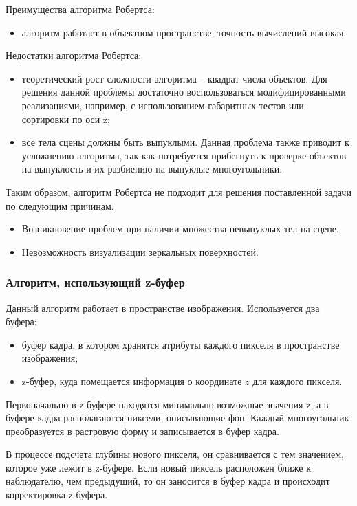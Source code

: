 Преимущества алгоритма Робертса:
\begin{itemize}
	\item алгоритм работает в объектном пространстве, точность вычислений высокая.
\end{itemize}

Недостатки алгоритма Робертса:
\begin{itemize}
	\item теоретический рост сложности алгоритма -- квадрат числа объектов. Для решения данной проблемы достаточно воспользоваться модифицированными реализациями, например, с использованием габаритных тестов или сортировки по оси z;
	\item все тела сцены должны быть выпуклыми. Данная проблема также приводит к усложнению алгоритма, так как потребуется прибегнуть к проверке объектов на выпуклость и их разбиению на выпуклые многоугольники.
\end{itemize}

Таким образом, алгоритм Робертса не подходит для решения поставленной задачи по следующим причинам.

\begin{itemize}
	\item Возникновение проблем при наличии множества невыпуклых тел на сцене.
	\item Невозможность визуализации зеркальных поверхностей.
\end{itemize}

\subsubsection{Алгоритм, использующий z-буфер}

Данный алгоритм работает в пространстве изображения. Используется два буфера:
\begin{itemize}
	\item буфер кадра, в котором хранятся атрибуты каждого пикселя в пространстве изображения;
	\item z-буфер, куда помещается информация о координате $z$ для каждого пикселя.
\end{itemize}

Первоначально в z-буфере находятся минимально возможные значения z, а в буфере кадра располагаются пиксели, описывающие фон. Каждый многоугольник преобразуется в растровую форму и записывается в буфер кадра.

В процессе подсчета глубины нового пикселя, он сравнивается с тем значением, которое уже лежит в z-буфере. Если новый пиксель расположен ближе к наблюдателю, чем предыдущий, то он заносится в буфер кадра и происходит корректировка z-буфера.

